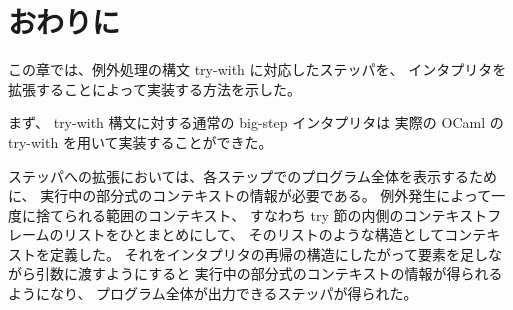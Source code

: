 \section{おわりに}
\label{section:try-with__conclusion}

この章では、例外処理の構文 try-with に対応したステッパを、
インタプリタを拡張することによって実装する方法を示した。

まず、 try-with 構文に対する通常の big-step インタプリタは
実際の OCaml の try-with を用いて実装することができた。

ステッパへの拡張においては、各ステップでのプログラム全体を表示するために、
実行中の部分式のコンテキストの情報が必要である。
例外発生によって一度に捨てられる範囲のコンテキスト、
すなわち try 節の内側のコンテキストフレームのリストをひとまとめにして、
そのリストのような構造としてコンテキストを定義した。
それをインタプリタの再帰の構造にしたがって要素を足しながら引数に渡すようにすると
実行中の部分式のコンテキストの情報が得られるようになり、
プログラム全体が出力できるステッパが得られた。
